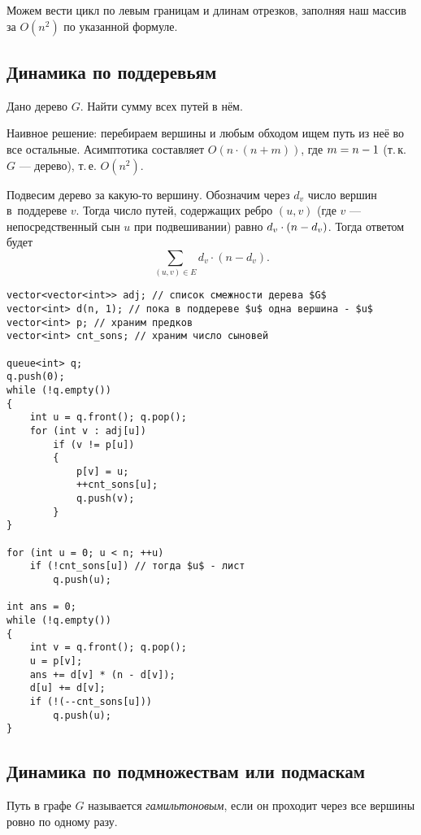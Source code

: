 Можем вести цикл по левым границам и длинам отрезков, заполняя наш массив за $O(n^2)$ по указанной формуле.

\subsection{Динамика по поддеревьям}

\begin{problem}
    Дано дерево $G$. Найти сумму всех путей в нём.
\end{problem}

Наивное решение: перебираем вершины и любым обходом ищем путь из неё во все остальные. Асимптотика составляет $O(n \cdot (n + m))$, где $m \hm = n - 1$ (т.\,к. $G$ --- дерево), т.\,е. $O(n^2)$.

Подвесим дерево за какую-то вершину. Обозначим через $d_v$ число вершин в~поддереве $v$. Тогда число путей, содержащих ребро $(u, v)$ (где $v$ --- непосредственный сын $u$ при подвешивании) равно $d_v \cdot (n \hm - d_v)$. Тогда ответом будет
\[
    \sum\limits_{(u, v) \in E}d_v \cdot (n - d_v).
\]

\begin{verbatim}
vector<vector<int>> adj; // список смежности дерева $G$
vector<int> d(n, 1); // пока в поддереве $u$ одна вершина - $u$
vector<int> p; // храним предков
vector<int> cnt_sons; // храним число сыновей

queue<int> q;
q.push(0);
while (!q.empty())
{
    int u = q.front(); q.pop();
    for (int v : adj[u])
        if (v != p[u])
        {
            p[v] = u;
            ++cnt_sons[u];
            q.push(v);
        }
}

for (int u = 0; u < n; ++u)
    if (!cnt_sons[u]) // тогда $u$ - лист
        q.push(u);

int ans = 0;
while (!q.empty())
{
    int v = q.front(); q.pop();
    u = p[v];
    ans += d[v] * (n - d[v]);
    d[u] += d[v];
    if (!(--cnt_sons[u]))
        q.push(u);
}
\end{verbatim}

\subsection{Динамика по подмножествам или подмаскам}

\begin{definition}
    Путь в графе $G$ называется \textit{гамильтоновым}, если он проходит через все вершины ровно по одному разу.
\end{definition}

